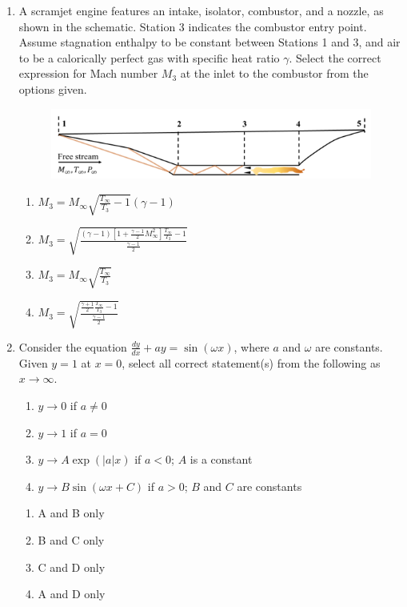 \documentclass{article}
\begin{document}
\begin{enumerate}[leftmargin=*, resume]
\item A scramjet engine features an intake, isolator, combustor, and a nozzle, as shown in the schematic. Station 3 indicates the combustor entry point. Assume stagnation enthalpy to be constant between Stations 1 and 3, and air to be a calorically perfect gas with specific heat ratio $\gamma$. Select the correct expression for Mach number $M_3$ at the inlet to the combustor from the options given.
\begin{figure}[H]
    \centering
    \includegraphics[width=0.3\linewidth]{figs/q41.png}
    \caption{}
    \label{fig:q41}
\end{figure}
\begin{multicols}{2}
\begin{enumerate}
\item $M_3 = M_\infty \sqrt{\frac{T_\infty}{T_3} - 1}(\gamma - 1)$
\item $M_3 = \sqrt{\frac{(\gamma - 1)\left[1 + \frac{\gamma - 1}{2}M_\infty^2\right]\frac{T_\infty}{T_3} - 1}{\frac{\gamma - 1}{2}}}$
\item $M_3 = M_\infty \sqrt{\frac{T_\infty}{T_3}}$
\item $M_3 = \sqrt{\frac{\frac{\gamma + 1}{2}\frac{T_\infty}{T_3} - 1}{\frac{\gamma - 1}{2}}}$
\end{enumerate}
\end{multicols}

\item Consider the equation $\frac{dy}{dx} + a y = \sin(\omega x)$, where $a$ and $\omega$ are constants. Given $y = 1$ at $x = 0$, select all correct statement(s) from the following as $x \to \infty$.
\begin{enumerate}
\item $y \to 0$ if $a \neq 0$
\item $y \to 1$ if $a = 0$
\item $y \to A \exp(|a|x)$ if $a < 0$; $A$ is a constant
\item $y \to B \sin(\omega x + C)$ if $a > 0$; $B$ and $C$ are constants
\end{enumerate}
\begin{multicols}{4}
\begin{enumerate}
\item A and B only
\item B and C only
\item C and D only
\item A and D only
\end{enumerate}
\end{multicols}


\end{enumerate}
\end{document}
